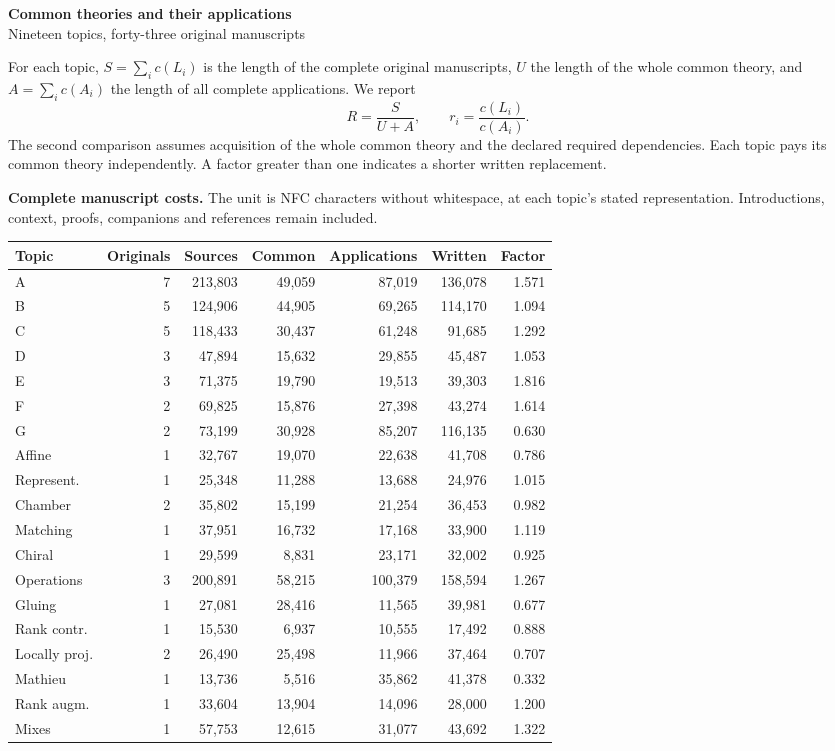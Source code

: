 \documentclass[11pt,a4paper]{article}
\newcommand{\tabsetup}{\small\setlength{\tabcolsep}{4pt}\renewcommand{\arraystretch}{1.10}}
\begin{document}
\begin{center}\Large\textbf{Common theories and their applications}\\[4pt]
\normalsize Nineteen topics, forty-three original manuscripts\end{center}
For each topic, $S=\sum_i c(L_i)$ is the length of the complete original
manuscripts, $U$ the length of the whole common theory, and $A=\sum_i c(A_i)$
the length of all complete applications. We report
\[
R=\frac{S}{U+A},\qquad r_i=\frac{c(L_i)}{c(A_i)}.
\]
The second comparison assumes acquisition of the whole common theory and
the declared required dependencies. Each topic pays its common theory
independently. A factor greater than one indicates a shorter written replacement.

\textbf{Complete manuscript costs.} The unit is NFC characters without
whitespace, at each topic's stated representation. Introductions, context,
proofs, companions and references remain included.
\begin{center}\tabsetup\begin{tabular}{lrrrrrr}\toprule
Topic & Originals & Sources & Common & Applications & Written & Factor\\\midrule
A & 7 & 213,803 & 49,059 & 87,019 & 136,078 & 1.571 \\
B & 5 & 124,906 & 44,905 & 69,265 & 114,170 & 1.094 \\
C & 5 & 118,433 & 30,437 & 61,248 & 91,685 & 1.292 \\
D & 3 & 47,894 & 15,632 & 29,855 & 45,487 & 1.053 \\
E & 3 & 71,375 & 19,790 & 19,513 & 39,303 & 1.816 \\
F & 2 & 69,825 & 15,876 & 27,398 & 43,274 & 1.614 \\
G & 2 & 73,199 & 30,928 & 85,207 & 116,135 & 0.630 \\
Affine & 1 & 32,767 & 19,070 & 22,638 & 41,708 & 0.786 \\
Represent. & 1 & 25,348 & 11,288 & 13,688 & 24,976 & 1.015 \\
Chamber & 2 & 35,802 & 15,199 & 21,254 & 36,453 & 0.982 \\
Matching & 1 & 37,951 & 16,732 & 17,168 & 33,900 & 1.119 \\
Chiral & 1 & 29,599 & 8,831 & 23,171 & 32,002 & 0.925 \\
Operations & 3 & 200,891 & 58,215 & 100,379 & 158,594 & 1.267 \\
Gluing & 1 & 27,081 & 28,416 & 11,565 & 39,981 & 0.677 \\
Rank contr. & 1 & 15,530 & 6,937 & 10,555 & 17,492 & 0.888 \\
Locally proj. & 2 & 26,490 & 25,498 & 11,966 & 37,464 & 0.707 \\
Mathieu & 1 & 13,736 & 5,516 & 35,862 & 41,378 & 0.332 \\
Rank augm. & 1 & 33,604 & 13,904 & 14,096 & 28,000 & 1.200 \\
Mixes & 1 & 57,753 & 12,615 & 31,077 & 43,692 & 1.322 \\
\bottomrule\end{tabular}\end{center}
\end{document}
